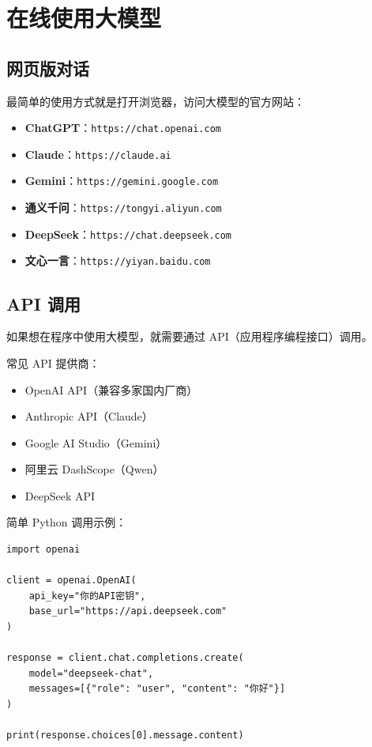 \documentclass[12pt,UTF8]{ctexbook}
\begin{document}
\chapter{在线使用大模型}

\section{网页版对话}

最简单的使用方式就是打开浏览器，访问大模型的官方网站：

\begin{itemize}
  \item \textbf{ChatGPT}：\texttt{https://chat.openai.com}
  \item \textbf{Claude}：\texttt{https://claude.ai}
  \item \textbf{Gemini}：\texttt{https://gemini.google.com}
  \item \textbf{通义千问}：\texttt{https://tongyi.aliyun.com}
  \item \textbf{DeepSeek}：\texttt{https://chat.deepseek.com}
  \item \textbf{文心一言}：\texttt{https://yiyan.baidu.com}
\end{itemize}

\section{API 调用}

如果想在程序中使用大模型，就需要通过 API（应用程序编程接口）调用。

常见 API 提供商：
\begin{itemize}
  \item OpenAI API（兼容多家国内厂商）
  \item Anthropic API（Claude）
  \item Google AI Studio（Gemini）
  \item 阿里云 DashScope（Qwen）
  \item DeepSeek API
\end{itemize}

简单 Python 调用示例：
\begin{verbatim}
import openai

client = openai.OpenAI(
    api_key="你的API密钥",
    base_url="https://api.deepseek.com"
)

response = client.chat.completions.create(
    model="deepseek-chat",
    messages=[{"role": "user", "content": "你好"}]
)

print(response.choices[0].message.content)
\end{verbatim}
\end{document}
